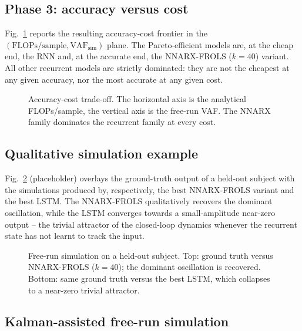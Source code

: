 \documentclass[conference]{IEEEtran}
\begin{document}
\subsection{Phase 3: accuracy versus cost}\label{sec:phase3}

Fig.~\ref{fig:pareto} reports the resulting accuracy-cost frontier
in the $(\mathrm{FLOPs}/\mathrm{sample},\mathrm{VAF}_{\mathrm{sim}})$
plane. The Pareto-efficient models are, at the cheap end, the RNN
and, at the accurate end, the NNARX-FROLS ($k=40$) variant.
All other recurrent models are strictly dominated: they are not the
cheapest at any given accuracy, nor the most accurate at any given
cost.

\begin{figure}[t]
\centering
\fbox{\rule{0pt}{4.5cm}\rule{0.85\linewidth}{0pt}}
\caption{Accuracy-cost trade-off. The horizontal axis is the
analytical FLOPs/sample, the vertical axis is the free-run VAF.
The NNARX family dominates the recurrent family at every cost.}
\label{fig:pareto}
\end{figure}

\subsection{Qualitative simulation example}

Fig.~\ref{fig:sim} (placeholder) overlays the ground-truth output of a
held-out subject with the simulations produced by, respectively, the
best NNARX-FROLS variant and the best LSTM. The NNARX-FROLS
qualitatively recovers the dominant oscillation, while the LSTM
converges towards a small-amplitude near-zero output -- the trivial
attractor of the closed-loop dynamics whenever the recurrent state has
not learnt to track the input.

\begin{figure}[t]
\centering
\fbox{\rule{0pt}{4.5cm}\rule{0.85\linewidth}{0pt}}
\caption{Free-run simulation on a held-out subject. Top: ground truth
versus NNARX-FROLS ($k=40$); the dominant oscillation is recovered.
Bottom: same ground truth versus the best LSTM, which collapses to a
near-zero trivial attractor.}
\label{fig:sim}
\end{figure}

\subsection{Kalman-assisted free-run simulation}\label{sec:kalman}
\end{document}
